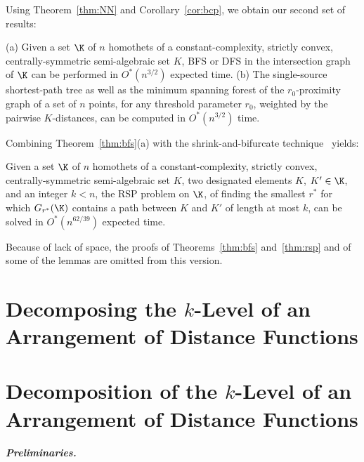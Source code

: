 \else
Using Theorem~\ref{thm:NN} and Corollary~\ref{cor:bcp}, we obtain our second set of results:
\fi
\begin{theorem} \label{thm:bfs}
(a) Given a set $\K$ of $n$ homothets of a constant-complexity, strictly convex, centrally-symmetric semi-algebraic set $K$,
BFS or DFS in the intersection graph of $\K$ can be performed in $O^*(n^{3/2})$ expected time. 
%
(b) The single-source shortest-path tree as well as the minimum spanning forest of the
$r_0$-proximity graph of a set of $n$ points, for any threshold parameter $r_0$, 
	weighted by the pairwise $K$-distances, can be computed in $O^*(n^{3/2})$ time.
\end{theorem}
%
Combining Theorem~\ref{thm:bfs}(a) with the shrink-and-bifurcate 
technique~\cite{BFKKS,KKSS} yields:
%
\begin{theorem} \label{thm:rsp}
Given a set $\K$ of $n$ homothets of a constant-complexity, strictly convex, centrally-symmetric semi-algebraic 
set $K$, two designated elements $K$, $K'\in \K$, and an integer $k < n$, the RSP problem on $\K$, of finding
the smallest $r^*$ for which $G_{r^*}(\K)$ contains a path between $K$ and $K'$ of length at most $k$,
can be solved in $O^*(n^{62/39})$ expected time.
\end{theorem}
\iffullver
\else
Because of lack of space, the proofs of Theorems~\ref{thm:bfs} and~\ref{thm:rsp} and of some of the lemmas are 
omitted from this version.
\fi
%
\ifsocgproc 
\section{Decomposing the $k$-Level of an Arrangement of Distance Functions} \label{sec:vd}
\else
\section{Decomposition of the $k$-Level of an Arrangement of Distance Functions} \label{sec:vd}
\fi
%
\ifsocgproc 
\subparagraph*{Preliminaries.}
\else
